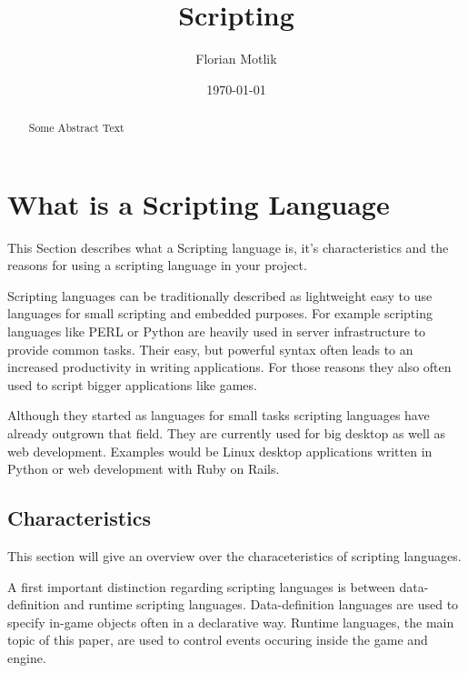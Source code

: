 \documentclass{article}
\begin{document}
\author{Florian Motlik}
\title{Scripting}
\date{\today}
\maketitle

\tableofcontents
\newpage

\begin{abstract}
Some Abstract Text
\end{abstract}

\section{What is a Scripting Language}
This Section describes what a Scripting language is, it's characteristics and
the reasons for using a scripting language in your project.

Scripting languages can be traditionally described as lightweight easy to use
languages for small scripting and embedded purposes. For example scripting
languages like PERL or Python are heavily used in server infrastructure to
provide common tasks. Their easy, but powerful syntax often leads to an increased
productivity in writing applications. For those reasons they also often used to
script bigger applications like games.

Although they started as languages for small tasks scripting languages have
already outgrown that field. They are currently used for big desktop as well
as web development. Examples would be Linux desktop applications written in
Python or web development with Ruby on Rails.
\subsection{Characteristics} \label{sec-characteristics}
This section will give an overview over the characeteristics of scripting
languages.

A first important distinction regarding scripting languages is between
data-definition and runtime scripting languages. Data-definition languages are
used to specify in-game objects often in a declarative way. Runtime languages,
the main topic of this paper, are used to control events occuring inside the
game and engine.
\end{document}

